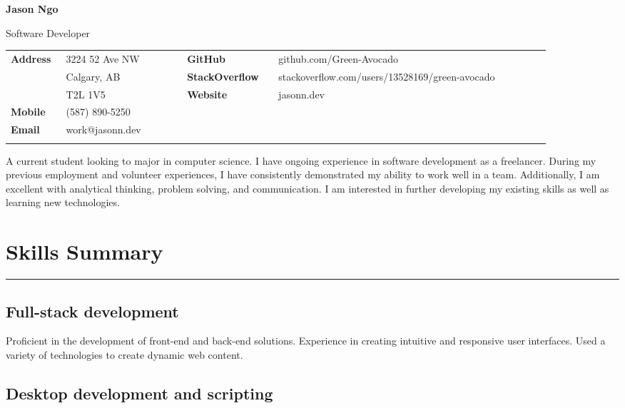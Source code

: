 \documentclass[letterpaper]{article}
\begin{document}
    {\Huge
    \textbf{Jason Ngo}}

    {\large
    Software Developer}

    {\small%
        \renewcommand{\arraystretch}{1.2}
        \begin{tabular}{p{0.08\linewidth} p{0.2\linewidth} p{0.15\linewidth} p{0.45\linewidth}}
            \\
            \textbf{Address} & 3224 52 Ave NW & \textbf{GitHub} & github.com/Green-Avocado \\
            & Calgary, AB & \textbf{StackOverflow} & stackoverflow.com/users/13528169/green-avocado \\
            & T2L 1V5 & \textbf{Website} & jasonn.dev \\
            \textbf{Mobile} & (587) 890-5250 \\
            \textbf{Email} & work@jasonn.dev \\
            \\
        \end{tabular}
    }

    A current student looking to major in computer science.
    I have ongoing experience in software development as a freelancer.
    During my previous employment and volunteer experiences, I have consistently demonstrated my ability to work well in a team.
    Additionally, I am excellent with analytical thinking, problem solving, and communication.
    I am interested in further developing my existing skills as well as learning new technologies.

    \section*{Skills Summary}

        \rule{\linewidth}{0.2pt}

        \subsection*{Full-stack development}

        Proficient in the development of front-end and back-end solutions.
        Experience in creating intuitive and responsive user interfaces.
        Used a variety of technologies to create dynamic web content.

        \subsection*{Desktop development and scripting}
\end{document}
